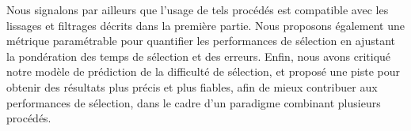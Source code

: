 	Nous signalons par ailleurs que l'usage de tels procédés est compatible avec les lissages et filtrages décrits dans la première partie. Nous proposons également une métrique paramétrable pour quantifier les performances de sélection en ajustant la pondération des temps de sélection et des erreurs. Enfin, nous avons critiqué notre modèle de prédiction de la difficulté de sélection, et proposé une piste pour obtenir des résultats plus précis et plus fiables, afin de mieux contribuer aux performances de sélection, dans le cadre d'un paradigme combinant plusieurs procédés.